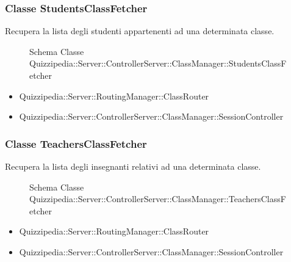 \subsubsection{Classe StudentsClassFetcher}
Recupera la lista degli studenti appartenenti ad una determinata classe.
\begin{figure}[H]
\centering
\noindent{}
\caption{Schema Classe Quizzipedia::Server::ControllerServer::ClassManager::StudentsClassFetcher}
\end{figure}
\begin{itemize}
\item Quizzipedia::Server::RoutingManager::ClassRouter
\end{itemize}
\begin{itemize}
\item Quizzipedia::Server::ControllerServer::ClassManager::SessionController
\end{itemize}
\subsubsection{Classe TeachersClassFetcher}
Recupera la lista degli insegnanti relativi ad una determinata classe.
\begin{figure}[H]
\centering
\noindent{}
\caption{Schema Classe Quizzipedia::Server::ControllerServer::ClassManager::TeachersClassFetcher}
\end{figure}
\begin{itemize}
\item Quizzipedia::Server::RoutingManager::ClassRouter
\end{itemize}
\begin{itemize}
\item Quizzipedia::Server::ControllerServer::ClassManager::SessionController
\end{itemize}
